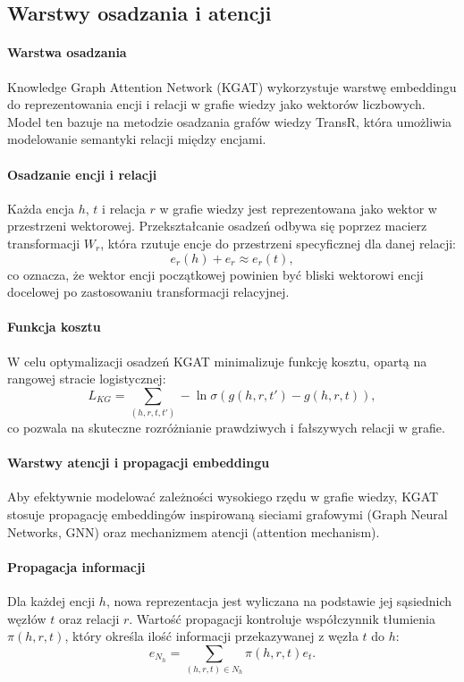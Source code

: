 \documentclass[a4paper,onecolumn]{LTJournalArticle}
\begin{document}
\subsection{Warstwy osadzania i atencji}

\paragraph{Warstwa osadzania} Knowledge Graph Attention Network (KGAT) wykorzystuje warstwę embeddingu do reprezentowania encji i relacji w grafie wiedzy jako wektorów liczbowych. Model ten bazuje na metodzie osadzania grafów wiedzy TransR, która umożliwia modelowanie semantyki relacji między encjami.

\paragraph{Osadzanie encji i relacji} Każda encja \( h \), \( t \) i relacja \( r \) w grafie wiedzy jest reprezentowana jako wektor w przestrzeni wektorowej. Przekształcanie osadzeń odbywa się poprzez macierz transformacji \( W_r \), która rzutuje encje do przestrzeni specyficznej dla danej relacji:
\begin{equation}
    e_r(h) + e_r \approx e_r(t),
\end{equation}
co oznacza, że wektor encji początkowej powinien być bliski wektorowi encji docelowej po zastosowaniu transformacji relacyjnej.

\paragraph{Funkcja kosztu} W celu optymalizacji osadzeń KGAT minimalizuje funkcję kosztu, opartą na rangowej stracie logistycznej:
\begin{equation}
    L_{KG} = \sum_{(h,r,t,t')} - \ln \sigma \left( g(h, r, t') - g(h, r, t) \right),
\end{equation}
co pozwala na skuteczne rozróżnianie prawdziwych i fałszywych relacji w grafie.

\paragraph{Warstwy atencji i propagacji embeddingu} Aby efektywnie modelować zależności wysokiego rzędu w grafie wiedzy, KGAT stosuje propagację embeddingów inspirowaną sieciami grafowymi (Graph Neural Networks, GNN) oraz mechanizmem atencji (attention mechanism). 

\paragraph{Propagacja informacji} Dla każdej encji \( h \), nowa reprezentacja jest wyliczana na podstawie jej sąsiednich węzłów \( t \) oraz relacji \( r \). Wartość propagacji kontroluje współczynnik tłumienia \( \pi(h, r, t) \), który określa ilość informacji przekazywanej z węzła \( t \) do \( h \):
\begin{equation}
    e_{N_h} = \sum_{(h,r,t) \in N_h} \pi(h, r, t) e_t.
\end{equation}
\end{document}
